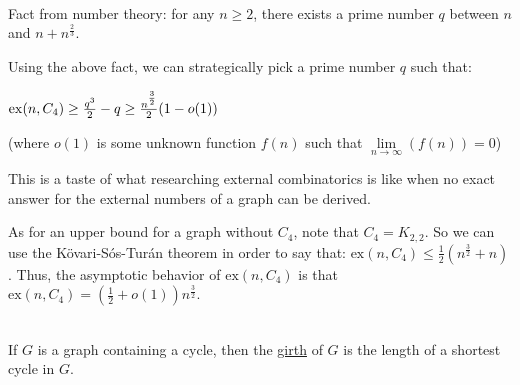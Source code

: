 \documentclass{book}
\newcommand{\hTwo}{%
   \color{MidnightBlue}%
   \fontsize{13}{15}\selectfont%
}
\newcommand{\hFour}{%
   \color{Cerulean}
   \fontsize{12}{14}\selectfont%
}
\newcommand{\teachComment}{
   \color{Orange}%
   \fontsize{12}{14}\selectfont%
}
\newenvironment{myIndent}{%
   \begin{adjustwidth}{2.5em}{0em}%
}{%
   \end{adjustwidth}%
}
\newenvironment{myDindent}{%
   \begin{adjustwidth}{5em}{0em}%
}{%
   \end{adjustwidth}%
}
\newcommand{\udefine}[1]{{%
   \setulcolor{Red}%
   \setul{0.14em}{0.07em}%
   \ul{#1}%
}}
\newcommand{\exNums}[1]{\mathrm{ex}(#1)}
\newcommand{\mySepTwo}[1][.]{%
   {\noindent\color{#1}{\rule{6.5in}{0.5mm}}}\\%
}
\newcommand{\retTwo}{\hfill\bigbreak}
\begin{document}
\mySepTwo

Fact from number theory: for any $n \geq 2$, there exists a prime number $q$ between $n$ and $n + n^{\frac{2}{3}}$.
{\begin{myIndent}
   \hTwo Using the above fact, we can strategically pick a prime number $q$ such that:

   {\center $ \exNums{n, C_4} \geq \frac{q^3}{2} - q\geq \frac{n^\frac{3\vphantom{|}}{2\vphantom{|}}}{2}(1 - o(1))$\retTwo\par} 
   
   {\begin{myDindent} \hFour
      (where $o(1)$ is some unknown function $f(n)$ such that $\lim\limits_{n\rightarrow \infty}(f(n)) = 0$) \retTwo

      \teachComment This is a taste of what researching external combinatorics is like when no exact answer for the external numbers of a graph can be derived.
   \end{myDindent}}
\end{myIndent}}

\newpage

As for an upper bound for a graph without $C_4$, note that $C_4 = K_{2,2}$. So we can use the Kövari-Sós-Turán theorem in order to say that: $ \exNums{n, C_4} \leq \frac{1}{2}(n^\frac{3}{2} + n)$. Thus, the asymptotic behavior of $\exNums{n, C_4}$ is that $ \exNums{n, C_4} = (\frac{1}{2} + o(1))n^\frac{3}{2}$. \retTwo

\mySepTwo

If $G$ is a graph containing a cycle, then the \udefine{girth} of $G$ is the length of a shortest cycle in $G$.
\end{document}
